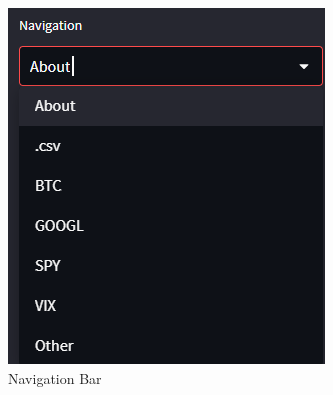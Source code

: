 \begin{figure}[ht]
    \centering
    \begin{minipage}[b]{0.4\textwidth}
        \includegraphics[width=\textwidth]{Images/navigation.png}
        \caption{Navigation Bar}
        \label{fig:image1}
    \end{minipage}
    \hfill
    \begin{minipage}[b]{0.4\textwidth}

\end{minipage}
\end{figure}
